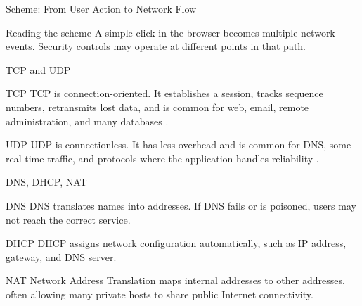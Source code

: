 \documentclass[presentation]{beamer}
\begin{document}
\begin{frame}[c]{Scheme: From User Action to Network Flow}
\begin{center}
\end{center}

\begin{block}{Reading the scheme}
A simple click in the browser becomes multiple network events. Security controls may operate at
different points in that path.
\end{block}
\end{frame}

\begin{frame}[c]{TCP and UDP}
\begin{block}{TCP}
TCP is connection-oriented. It establishes a session, tracks sequence numbers, retransmits lost data,
and is common for web, email, remote administration, and many databases \cite{rfc9293}.
\end{block}

\begin{block}{UDP}
UDP is connectionless. It has less overhead and is common for DNS, some real-time traffic, and
protocols where the application handles reliability \cite{rfc768}.
\end{block}
\end{frame}

\begin{frame}[c]{DNS, DHCP, NAT}
\begin{block}{DNS}
DNS translates names into addresses. If DNS fails or is poisoned, users may not reach the correct
service.
\end{block}

\begin{block}{DHCP}
DHCP assigns network configuration automatically, such as IP address, gateway, and DNS server.
\end{block}

\begin{block}{NAT}
Network Address Translation maps internal addresses to other addresses, often allowing many private
hosts to share public Internet connectivity.
\end{block}
\end{frame}
\end{document}
